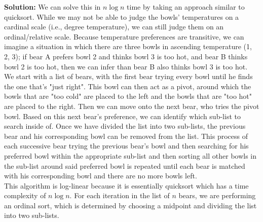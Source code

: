 \documentclass[10pt]{article}
\begin{document}
\begin{enumerate}
    \textbf{Solution: }
    We can solve this in $n \log n$ time by taking an approach similar to quicksort. While we may not be able to judge the bowls' temperatures on a cardinal scale (i.e., degree temperature), we can still judge them on an ordinal/relative scale. Because temperature preferences are transitive, we can imagine a situation in which there are three bowls in ascending temperature (1, 2, 3); if bear A prefers bowl 2 and thinks bowl 3 is too hot, and bear B thinks bowl 2 is too hot, then we can infer than bear B also thinks bowl 3 is too hot.\\
    We start with a list of bears, with the first bear trying every bowl until he finds the one that's "just right". This bowl can then act as a pivot, around which the bowls that are "too cold" are placed to the left and the bowls that are "too hot" are placed to the right. Then we can move onto the next bear, who tries the pivot bowl. Based on this next bear's preference, we can identify which sub-list to search inside of. Once we have divided the list into two sub-lists, the previous bear and his corresponding bowl can be removed from the list. This process of each successive bear trying the previous bear's bowl and then searching for his preferred bowl within the appropriate sub-list and then sorting all other bowls in the sub-list around said preferred bowl is repeated until each bear is matched with his corresponding bowl and there are no more bowls left. \\
    This algorithm is log-linear because it is essentially quicksort which has a time complexity of $n\log n$. For each iteration in the list of $n$ bears, we are performing an ordinal sort, which is determined by choosing a midpoint and dividing the list into two sub-lists.
    
\end{enumerate}
\end{document}
